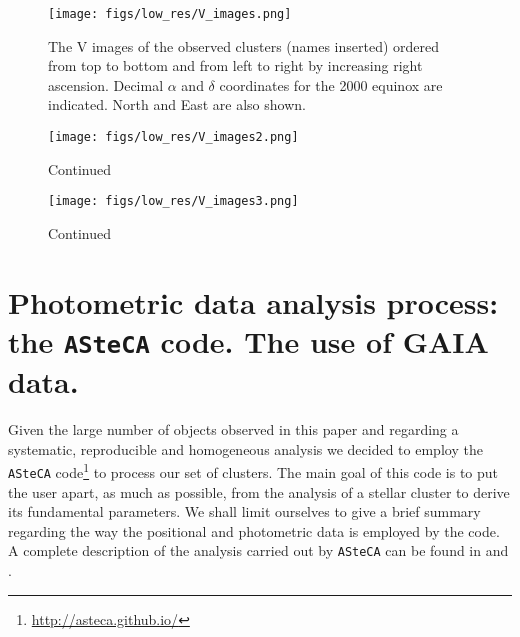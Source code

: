 \documentclass{aa}
\begin{document}
\begin{figure*}[ht]
    \centering
     \texttt{[image: figs/low\_res/V\_images.png]}   
     \caption{The V images of the observed clusters (names inserted) ordered
     from top to bottom and from left to right by increasing right ascension.
     Decimal $\alpha$ and $\delta$ coordinates for the 2000 equinox are
     indicated. North and East are also shown.}
    \label{fig2}
\end{figure*}

\begin{figure*}[ht]
    \addtocounter{figure}{-1}
    \centering
    \texttt{[image: figs/low\_res/V\_images2.png]}
    \caption{Continued}
    \label{fig2a}
\end{figure*}

\begin{figure*}[ht]
    \addtocounter{figure}{-1}
    \centering
    \texttt{[image: figs/low\_res/V\_images3.png]}
    \caption{Continued}
    \label{fig2b}
\end{figure*}








\section{Photometric data analysis process: the \texttt{ASteCA} code. The use of
GAIA data.}
\label{sec:photom_analysis}

Given the large number of objects observed in this paper and regarding a
systematic, reproducible and homogeneous analysis we decided to employ the
\texttt{ASteCA} code\footnote{\url{http://asteca.github.io/}} to process our set
of clusters. The main goal of this code is to put the user apart, as much as
possible, from the analysis of a stellar cluster to derive its fundamental
parameters. We shall limit ourselves to give a brief summary regarding the way
the positional and photometric data is employed by the code.
A complete description of the analysis carried out by
\texttt{ASteCA} can be found in \cite{Perren_2015} and \cite{Perren_2017}.
\end{document}
